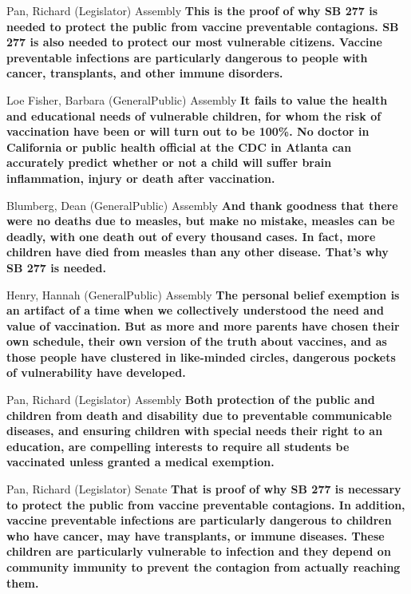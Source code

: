 \begin{result}{12.399020835139504}{Pan, Richard (Legislator) Assembly}
\textbf{This is the proof of why SB 277 is needed to protect the public from vaccine preventable contagions. SB 277 is also needed to protect our most vulnerable citizens. Vaccine preventable infections are particularly dangerous to people with cancer, transplants, and other immune disorders.
}\end{result}

\begin{result}{11.715124538755342}{Loe Fisher, Barbara (GeneralPublic) Assembly}
\textbf{It fails to value the health and educational needs of vulnerable children, for whom the risk of vaccination have been or will turn out to be 100\%. No doctor in California or public health official at the CDC in Atlanta can accurately predict whether or not a child will suffer brain inflammation, injury or death after vaccination.
}\end{result}

\begin{result}{10.650676879567987}{Blumberg, Dean (GeneralPublic) Assembly}
\textbf{And thank goodness that there were no deaths due to measles, but make no mistake, measles can be deadly, with one death out of every thousand cases. In fact, more children have died from measles than any other disease. That's why SB 277 is needed.
}\end{result}

\begin{result}{10.277112279676443}{Henry, Hannah (GeneralPublic) Assembly}
\textbf{The personal belief exemption is an artifact of a time when we collectively understood the need and value of vaccination. But as more and more parents have chosen their own schedule, their own version of the truth about vaccines, and as those people have clustered in like-minded circles, dangerous pockets of vulnerability have developed.
}\end{result}

\begin{result}{9.180445533243097}{Pan, Richard (Legislator) Assembly}
\textbf{Both protection of the public and children from death and disability due to preventable communicable diseases, and ensuring children with special needs their right to an education, are compelling interests to require all students be vaccinated unless granted a medical exemption.
}\end{result}

\begin{result}{9.135690999540271}{Pan, Richard (Legislator) Senate}
\textbf{That is proof of why SB 277 is necessary to protect the public from vaccine preventable contagions. In addition, vaccine preventable infections are particularly dangerous to children who have cancer, may have transplants, or immune diseases. These children are particularly vulnerable to infection and they depend on community immunity to prevent the contagion from actually reaching them.
}\end{result}

